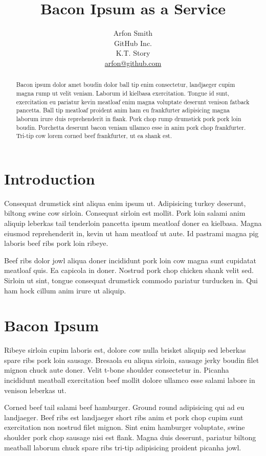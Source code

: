 \documentclass[a4paper,10pt]{article}
\title{Bacon Ipsum as a Service \vspace{-0.2cm}}
\author{
Arfon Smith\\
GitHub Inc.\\
K.T. Story \\
\url{arfon@github.com}
}
\date{}
\begin{document}
\maketitle

\vspace{-1.2cm}
\begin{abstract}

\noindent
Bacon ipsum dolor amet boudin dolor ball tip enim consectetur, landjaeger cupim magna rump ut velit veniam. Laborum id kielbasa exercitation. Tongue id sunt, exercitation eu pariatur kevin meatloaf enim magna voluptate deserunt venison fatback pancetta. Ball tip meatloaf proident anim ham eu frankfurter adipisicing magna laborum irure duis reprehenderit in flank. Pork chop rump drumstick pork pork loin boudin. Porchetta deserunt bacon veniam ullamco esse in anim pork chop frankfurter. Tri-tip cow lorem corned beef frankfurter, ut ea shank est.
\end{abstract}

\section{Introduction}

Consequat drumstick sint aliqua enim ipsum ut. Adipisicing turkey deserunt, biltong swine cow sirloin. Consequat sirloin est mollit. Pork loin salami anim aliquip leberkas tail tenderloin pancetta ipsum meatloaf doner ea kielbasa. Magna eiusmod reprehenderit in, kevin ut ham meatloaf ut aute. Id pastrami magna pig laboris beef ribs pork loin ribeye.

Beef ribs dolor jowl aliqua doner incididunt pork loin cow magna sunt cupidatat meatloaf quis. Ea capicola in doner. Nostrud pork chop chicken shank velit sed. Sirloin ut sint, tongue consequat drumstick commodo pariatur turducken in. Qui ham hock cillum anim irure ut aliquip.

\section{Bacon Ipsum}

Ribeye sirloin cupim laboris est, dolore cow nulla brisket aliquip sed leberkas spare ribs pork loin sausage. Bresaola eu aliqua sirloin, sausage jerky boudin filet mignon chuck aute doner. Velit t-bone shoulder consectetur in. Picanha incididunt meatball exercitation beef mollit dolore ullamco esse salami labore in venison leberkas ut.

Corned beef tail salami beef hamburger. Ground round adipisicing qui ad eu landjaeger. Beef ribs est landjaeger short ribs anim et pork chop cupim sunt exercitation non nostrud filet mignon. Sint enim hamburger voluptate, swine shoulder pork chop sausage nisi est flank. Magna duis deserunt, pariatur biltong meatball laborum chuck spare ribs tri-tip adipisicing proident picanha jowl.
\end{document}
